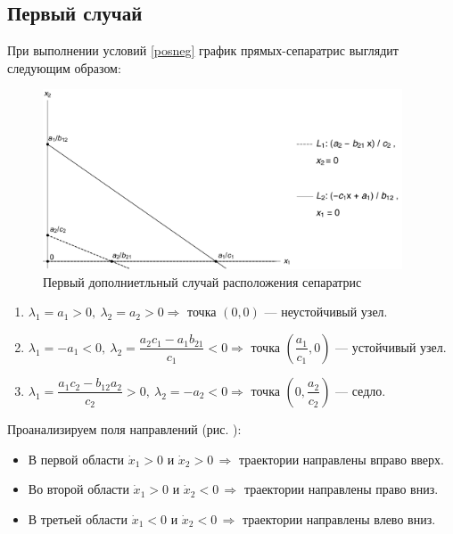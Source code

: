 \documentclass[12pt,a4paper]{article}
\begin{document}
    \subsection{Первый случай}
    При выполнении условий \eqref{posneg} график прямых-сепаратрис выглядит следующим образом:
    \begin{figure}[h]
        \centering
        \includegraphics[width=0.95\textwidth]{sep_3.pdf}
        \caption{Первый дополниетльный случай расположения сепаратрис}
        \label{fig:sep_3}
    \end{figure}
    \begin{enumerate}
        \setlength\itemsep{0.5em}
        \item $ \lambda_1 = a_1 > 0,\ \lambda_2 = a_2 > 0 \Rightarrow $ точка $ (0, 0) $ --- неустойчивый узел.
    
        \item $ \lambda_1 = -a_1 < 0,\ \lambda_2 = \dfrac{a_2 c_1 - a_1 b_{21}}{c_1} < 0 \Rightarrow $ точка $ \left( \dfrac{a_1}{c_1}, 0 \right) $ --- устойчивый узел.
        
        \item  $ \lambda_1 = \dfrac{a_1 c_2 - b_{12} a_2}{c_2} > 0,\ \lambda_2 = -a_2 < 0 \Rightarrow $ точка $ \left( 0, \dfrac{a_2}{c_2} \right) $ --- седло.
        \\[0.05em]
    \end{enumerate}

    Проанализируем поля направлений (рис. ):

    \begin{itemize}
        \setlength\itemsep{0.4em}
        \item В первой области $ \dot x_1 > 0 $ и $ \dot x_2 > 0 \, \Rightarrow $ траектории направлены вправо вверх.
        \item Во второй области $ \dot x_1 > 0 $ и $ \dot x_2 < 0 \, \Rightarrow $ траектории направлены право вниз.
        \item В третьей области $ \dot x_1 < 0 $ и $ \dot x_2 < 0 \, \Rightarrow $ траектории направлены влево вниз.
    \end{itemize}
\end{document}
